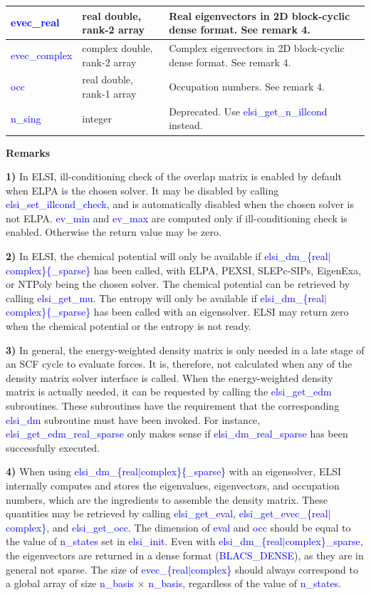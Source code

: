 \documentclass{report}
\newcommand{\tcb}[1]{\textcolor{blue}{#1}}
\begin{document}
\begin{tabular}[]{|p{30mm}|p{45mm}|p{90mm}|}
\hline
\tcb{evec\_real}           & real double, rank-2 array    & Real eigenvectors in 2D block-cyclic dense format. See remark 4.\\
\hline
\tcb{evec\_complex}        & complex double, rank-2 array & Complex eigenvectors in 2D block-cyclic dense format. See remark 4.\\
\hline
\tcb{occ}                  & real double, rank-1 array    & Occupation numbers. See remark 4.\\
\hline
\tcb{n\_sing}              & integer                      & Deprecated. Use \tcb{elsi\_get\_n\_illcond} instead.\\
\hline
\end{tabular}

\newpage
\textbf{Remarks}

\textbf{1)} In ELSI, ill-conditioning check of the overlap matrix is enabled by default when ELPA is the chosen solver. It may be disabled by calling \tcb{elsi\_set\_illcond\_check}, and is automatically disabled when the chosen solver is not ELPA. \tcb{ev\_min} and \tcb{ev\_max} are computed only if ill-conditioning check is enabled. Otherwise the return value may be zero.

\textbf{2)} In ELSI, the chemical potential will only be available if \tcb{elsi\_dm\_\{real$\vert$complex\}\{\_sparse\}} has been called, with ELPA, PEXSI, SLEPc-SIPs, EigenExa, or NTPoly being the chosen solver. The chemical potential can be retrieved by calling \tcb{elsi\_get\_mu}. The entropy will only be available if \tcb{elsi\_dm\_\{real$\vert$complex\}\{\_sparse\}} has been called with an eigensolver. ELSI may return zero when the chemical potential or the entropy is not ready.

\textbf{3)} In general, the energy-weighted density matrix is only needed in a late stage of an SCF cycle to evaluate forces. It is, therefore, not calculated when any of the density matrix solver interface is called. When the energy-weighted density matrix is actually needed, it can be requested by calling the \tcb{elsi\_get\_edm} subroutines. These subroutines have the requirement that the corresponding \tcb{elsi\_dm} subroutine must have been invoked. For instance, \tcb{elsi\_get\_edm\_real\_sparse} only makes sense if \tcb{elsi\_dm\_real\_sparse} has been successfully executed.

\textbf{4)} When using \tcb{elsi\_dm\_\{real$\vert$complex\}\{\_sparse\}} with an eigensolver, ELSI internally computes and stores the eigenvalues, eigenvectors, and occupation numbers, which are the ingredients to assemble the density matrix. These quantities may be retrieved by calling \tcb{elsi\_get\_eval}, \tcb{elsi\_get\_evec\_\{real$\vert$complex\}}, and \tcb{elsi\_get\_occ}. The dimension of \tcb{eval} and \tcb{occ} should be equal to the value of \tcb{n\_states} set in \tcb{elsi\_init}. Even with \tcb{elsi\_dm\_\{real$\vert$complex\}\_sparse}, the eigenvectors are returned in a dense format (\tcb{BLACS\_DENSE}), as they are in general not sparse. The size of \tcb{evec\_\{real$\vert$complex\}} should always correspond to a global array of size \tcb{n\_basis} $\times$ \tcb{n\_basis}, regardless of the value of \tcb{n\_states}.
\end{document}
